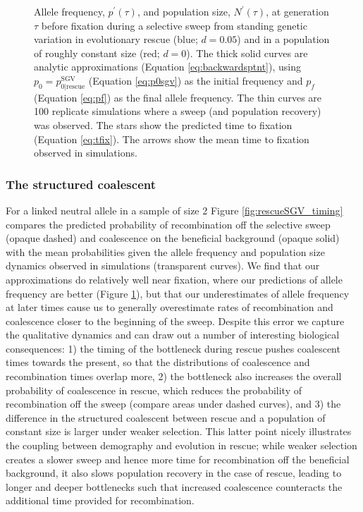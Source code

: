 \documentclass[]{article}
\begin{document}
\begin{figure}[htbp]
\caption{
Allele frequency, $p^\prime(\tau)$, and population size, $N^\prime(\tau)$, at generation $\tau$ before fixation during a selective sweep from standing genetic variation in evolutionary rescue (blue; $d=0.05$) and in a population of roughly constant size (red; $d=0$).
The thick solid curves are analytic approximations (Equation \ref{eq:backwardsptnt}), using $p_0 = p_{0|\mathrm{rescue}}^\mathrm{SGV}$ (Equation \ref{eq:p0sgv}) as the initial frequency and $p_f$ (Equation \ref{eq:pf}) as the final allele frequency.
The thin curves are 100 replicate simulations where a sweep (and population recovery) was observed.
The stars show the predicted time to fixation (Equation \ref{eq:tfix}).
The arrows show the mean time to fixation observed in simulations. 
}%
\label{fig:rescueSGV_dynamics}
\end{figure}

\subsubsection*{The structured coalescent}

For a linked neutral allele in a sample of size 2 Figure \ref{fig:rescueSGV_timing} compares the predicted probability of recombination off the selective sweep (opaque dashed) and coalescence on the beneficial background (opaque solid) with the mean probabilities given the allele frequency and population size dynamics observed in simulations (transparent curves).
We find that our approximations do relatively well near fixation, where our predictions of allele frequency are better (Figure \ref{fig:rescueSGV_dynamics}), but that our underestimates of allele frequency at later times cause us to generally overestimate rates of recombination and coalescence closer to the beginning of the sweep.
Despite this error we capture the qualitative dynamics and can draw out a number of interesting biological consequences: 
1) the timing of the bottleneck during rescue pushes coalescent times towards the present, so that the distributions of coalescence and recombination times overlap more,
2) the bottleneck also increases the overall probability of coalescence in rescue, which reduces the probability of recombination off the sweep (compare areas under dashed curves), and
3) the difference in the structured coalescent between rescue and a population of constant size is larger under weaker selection.
This latter point nicely illustrates the coupling between demography and evolution in rescue; while weaker selection creates a slower sweep and hence more time for recombination off the beneficial background, it also slows population recovery in the case of rescue, leading to longer and deeper bottlenecks such that increased coalescence counteracts the additional time provided for recombination.
\end{document}
